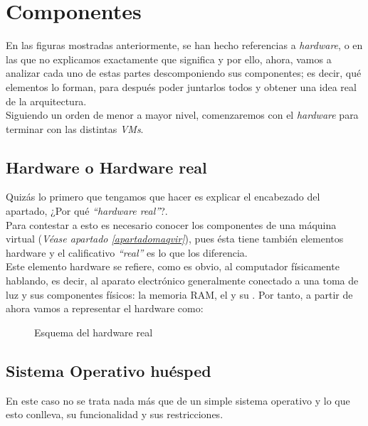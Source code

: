 \section{Componentes}
En las figuras mostradas anteriormente, se han hecho referencias a \emph{hardware}, \emph{} o \emph{} en las que no explicamos exactamente que significa y por ello, ahora, vamos a analizar cada uno de estas partes descomponiendo sus componentes; es decir, qué elementos lo forman, para después poder juntarlos todos y obtener una idea real de la arquitectura.\\

Siguiendo un orden de menor a mayor nivel, comenzaremos con el \emph{hardware} para terminar con las distintas \emph{VMs}.

\subsection{Hardware o Hardware real}
Quizás lo primero que tengamos que hacer es explicar el encabezado del apartado, ¿Por qué \emph{\textquotedblleft hardware real\textquotedblright}?.\\
Para contestar a esto es necesario conocer los componentes de una máquina virtual (\textit{Véase apartado \ref{apartadomaqvir}}), pues ésta tiene también elementos hardware y el calificativo \emph{\textquotedblleft real\textquotedblright} es lo que los diferencia.\\

Este elemento hardware se refiere, como es obvio, al computador físicamente hablando, es decir, al aparato electrónico generalmente conectado a una toma de luz y sus componentes físicos: la memoria RAM, el   y su . Por tanto, a partir de ahora vamos a representar el hardware como:

\begin{figure}[H]
\begin{center}
\end{center}
\caption[Hardware Real]{Esquema del hardware real}
\end{figure}

\subsection{Sistema Operativo huésped}\label{sohost}
En este caso no se trata nada más que de un simple sistema operativo y lo que esto conlleva, su funcionalidad y sus restricciones.\\

